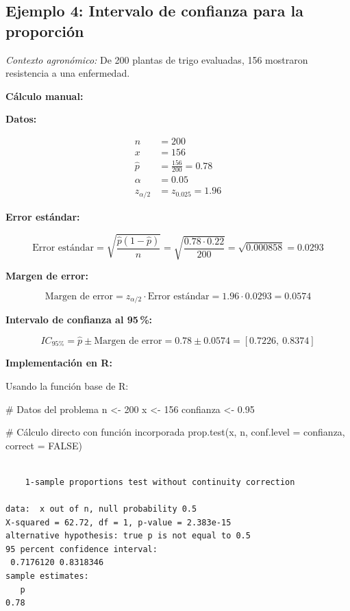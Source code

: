 \documentclass[
  spanish,
  letterpaper,
]{book}
\newenvironment{Shaded}{\begin{snugshade}}{\end{snugshade}}
\newcommand{\AttributeTok}[1]{\textcolor[rgb]{0.40,0.45,0.13}{#1}}
\newcommand{\CommentTok}[1]{\textcolor[rgb]{0.37,0.37,0.37}{#1}}
\newcommand{\ConstantTok}[1]{\textcolor[rgb]{0.56,0.35,0.01}{#1}}
\newcommand{\DecValTok}[1]{\textcolor[rgb]{0.68,0.00,0.00}{#1}}
\newcommand{\FloatTok}[1]{\textcolor[rgb]{0.68,0.00,0.00}{#1}}
\newcommand{\FunctionTok}[1]{\textcolor[rgb]{0.28,0.35,0.67}{#1}}
\newcommand{\NormalTok}[1]{\textcolor[rgb]{0.00,0.23,0.31}{#1}}
\newcommand{\OtherTok}[1]{\textcolor[rgb]{0.00,0.23,0.31}{#1}}
\begin{document}
\subsection{Ejemplo 4: Intervalo de confianza para la
proporción}\label{ejemplo-4-intervalo-de-confianza-para-la-proporciuxf3n}

\emph{Contexto agronómico:} De 200 plantas de trigo evaluadas, 156
mostraron resistencia a una enfermedad.

\textbf{Cálculo manual:}

\textbf{Datos:}

\[
\begin{aligned}
n &= 200 \\
x &= 156 \\
\hat{p} &= \frac{156}{200} = 0.78 \\
\alpha &= 0.05 \\
z_{\alpha/2} &= z_{0.025} = 1.96
\end{aligned}
\]

\textbf{Error estándar:}

\[
\text{Error estándar} = \sqrt{ \frac{\hat{p}(1 - \hat{p})}{n} } = \sqrt{ \frac{0.78 \cdot 0.22}{200} } = \sqrt{0.000858} = 0.0293
\]

\textbf{Margen de error:}

\[
\text{Margen de error} = z_{\alpha/2} \cdot \text{Error estándar} = 1.96 \cdot 0.0293 = 0.0574
\]

\textbf{Intervalo de confianza al 95\,\%:}

\[
IC_{95\%} = \hat{p} \pm \text{Margen de error} = 0.78 \pm 0.0574 = [0.7226,\ 0.8374]
\]

\textbf{Implementación en R:}

Usando la función base de R:

\begin{Shaded}
\begin{Highlighting}[]
\CommentTok{\# Datos del problema}
\NormalTok{n }\OtherTok{\textless{}{-}} \DecValTok{200}
\NormalTok{x }\OtherTok{\textless{}{-}} \DecValTok{156}
\NormalTok{confianza }\OtherTok{\textless{}{-}} \FloatTok{0.95}

\CommentTok{\# Cálculo directo con función incorporada}
\FunctionTok{prop.test}\NormalTok{(x, n, }\AttributeTok{conf.level =}\NormalTok{ confianza, }\AttributeTok{correct =} \ConstantTok{FALSE}\NormalTok{)}
\end{Highlighting}
\end{Shaded}

\begin{verbatim}

    1-sample proportions test without continuity correction

data:  x out of n, null probability 0.5
X-squared = 62.72, df = 1, p-value = 2.383e-15
alternative hypothesis: true p is not equal to 0.5
95 percent confidence interval:
 0.7176120 0.8318346
sample estimates:
   p 
0.78 
\end{verbatim}
\end{document}
